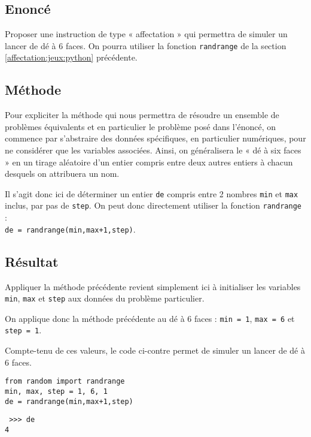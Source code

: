 \subsection{Enoncé}\label{affectation:jeux:enonce}
Proposer une instruction de type « affectation » qui permettra
de simuler un lancer de dé à 6 faces. 
On pourra utiliser la fonction \texttt{randrange} 
de la section \ref{affectation:jeux:python} précédente.

\subsection{Méthode}\label{affectation:jeux:methode}
Pour expliciter la méthode qui nous permettra de résoudre un ensemble de problèmes 
équivalents et en particulier le problème posé dans l'énoncé, on commence par s'abstraire 
des données spécifiques, en particulier numériques, pour ne considérer que les variables associées. 
Ainsi, on généralisera le « dé à six faces » en un tirage aléatoire d'un entier compris entre deux 
autres entiers à chacun desquels on attribuera un nom.

Il s'agit donc ici de déterminer un entier \texttt{de} compris entre 2 nombres \texttt{min} et \texttt{max}
inclus, par pas de \texttt{step}.
On peut donc directement utiliser la fonction \texttt{randrange} :\\
\texttt{de = randrange(min,max+1,step)}.

\subsection{Résultat}\label{affectation:jeux:resultat}
Appliquer la méthode précédente revient simplement ici à initialiser les variables
\texttt{min}, \texttt{max} et \texttt{step} aux données du problème particulier.

On applique donc la méthode précédente au dé à 6 faces : \texttt{min = 1}, \texttt{max = 6} et 
\texttt{step = 1}.

\noindent\begin{minipage}{7cm}
Compte-tenu de ces valeurs, le code \python{} ci-contre
permet de simuler un lancer de dé à 6 faces.
\end{minipage}
\hfill
\begin{minipage}{8cm}
\begin{lstlisting}[caption=\textbf{lancer de dé}]
from random import randrange
min, max, step = 1, 6, 1
de = randrange(min,max+1,step)
\end{lstlisting}
\tt\footnotesize
>>> de\\
4
\end{minipage}
\vspace*{2mm}

